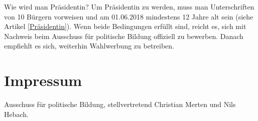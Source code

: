 \documentclass{sasbase}
\begin{document}
\begin{question}{Wie wird man Pr\"{a}sidentin?}
	Um Pr\"{a}sidentin zu werden, muss man Unterschriften von 10 B\"{u}rgern vorweisen und am 01.06.2018 mindestens 12 Jahre alt sein (siehe Artikel \ref{Präsidentin}). Wenn beide Bedingungen erf\"{u}llt sind, reicht es, sich mit Nachweis beim Ausschuss f\"{u}r politische Bildung offiziell zu bewerben. Danach empfiehlt es sich, weiterhin Wahlwerbung zu betreiben.
\end{question}

\section{Impressum}
Ausschuss f\"{u}r politische Bildung, stellvertretend Christian Merten und Nils Hebach.
\end{document}

